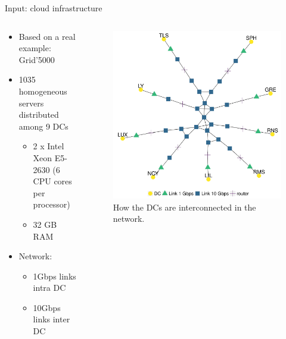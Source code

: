 \documentclass[Ligatures=TeX,table,svgnames,usetotalslideindicator,compress,10pt,aspectratio=169]{beamer}
\begin{document}
\begin{frame}{Input: cloud infrastructure} 
  \begin{columns}    
    \begin{column}{0.5\textwidth}
      \begin{itemize}        
      \item Based on a real example: Grid'5000
      \item 1035 homogeneous servers distributed among 9 DCs
        \begin{itemize}        
        \item 2 x Intel Xeon E5-2630 (6 CPU cores per processor)
        \item 32 GB RAM
        \end{itemize}
      \item Network:
        \begin{itemize}                         
        \item 1Gbps links intra DC
        \item 10Gbps links inter DC
        \end{itemize}
      \end{itemize}
    \end{column}
    
    \begin{column}{0.5\textwidth}
      \begin{figure}[!h]
        \centering
        \includegraphics[width=.9\textwidth]{images/topology.png}
        \caption{How the DCs are interconnected in the network.}
      \end{figure}
    \end{column}        
  \end{columns}    
\end{frame}
\end{document}
